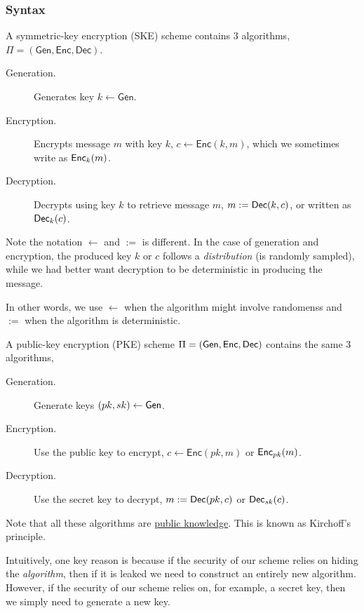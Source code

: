 \subsubsection{Syntax}
\begin{definition}
    A symmetric-key encryption (SKE) scheme contains 3 algorithms, $\Pi = (\mathsf{Gen}, \mathsf{Enc}, \mathsf{Dec})$.

    \begin{description}
        \item[Generation.] Generates key $k\leftarrow \mathsf{Gen}$.
        \item[Encryption.] Encrypts message $m$ with key $k$, $c\leftarrow \mathsf{Enc}(k, m)$, which we sometimes write as $\operatorname{\mathsf{Enc}}_k(m)$.
        \item[Decryption.] Decrypts using key $k$ to retrieve message $m$, $m := \operatorname{\mathsf{Dec}}(k, c)$, or written as $\operatorname{\mathsf{Dec}}_k(c)$.
    \end{description}
    Note the notation $\leftarrow$ and $:=$ is different. In the case of generation and encryption, the produced key $k$ or $c$ follows a \emph{distribution} (is randomly sampled), while we had better want decryption to be deterministic in producing the message. 
    
    In other words, we use $\leftarrow$ when the algorithm might involve randomenss and $:=$ when the algorithm is deterministic.
\end{definition}

\begin{definition}
    A public-key encryption (PKE) scheme $\Pi = (\operatorname{\mathsf{Gen}}, \operatorname{\mathsf{Enc}}, \operatorname{\mathsf{Dec}})$ contains the same $3$ algorithms,

    \begin{description}
        \item[Generation.] Generate keys $(pk, sk)\leftarrow \operatorname{\mathsf{Gen}}$.
        \item[Encryption.] Use the public key to encrypt, $c\leftarrow \mathsf{Enc}(pk, m)$ or $\operatorname{\mathsf{Enc}}_{pk}(m)$.
        \item[Decryption.] Use the secret key to decrypt, $m:=\operatorname{\mathsf{Dec}}(pk, c)$ or $\operatorname{\mathsf{Dec}}_{sk}(c)$.
    \end{description}
\end{definition}

\begin{remark}
    Note that all these algorithms are \ul{public knowledge}. This is known as Kirchoff's principle.

    Intuitively, one key reason is because if the security of our scheme relies on hiding the \emph{algorithm}, then if it is leaked we need to construct an entirely new algorithm. However, if the security of our scheme relies on, for example, a secret key, then we simply need to generate a new key.
\end{remark}

